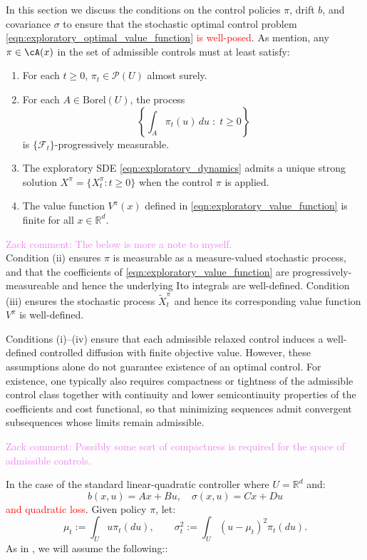 \documentclass[11pt,oneside,reqno]{article}
\theoremstyle{plain}
\theoremstyle{definition}
\numberwithin{equation}{section}
\renewcommand{\cite}{\citet}
\newcommand{\R}{\mathbb{R}}
\newcommand{\red}{\textcolor{red}}
\newcommand{\zack}[1]{\textcolor{Violet}{Zack comment: #1}}
\begin{document}
In this section we discuss the conditions on the control policies $\pi$, drift $b$, and covariance $\sigma$ to ensure that the 
stochastic optimal control problem \eqref{eqn:exploratory_optimal_value_function} \red{is well-posed}. As \cite{WangZariphopoulouZhou2020} mention, any $\pi \in \cA(x)$ in the set of admissible 
controls must at least satisfy:
%
\begin{enumerate}[label=(\roman*)]
    \item For each $t \ge 0$, $\pi_t \in \mathcal{P}(U)$ almost surely.

    \item For each $A \in \mathrm{Borel}(U)$, the process
    \[
    \left\{ \int_A \pi_t(u)\,du \;:\; t \ge 0 \right\}
    \]
    is $\{\mathcal{F}_t\}$-progressively measurable.

    \item The exploratory SDE \eqref{eqn:exploratory_dynamics} admits a unique strong solution
    $X^\pi = \{X^\pi_t : t \ge 0\}$ when the control $\pi$ is applied.

    \item The value function $V^\pi(x)$ defined in \eqref{eqn:exploratory_value_function} is finite for all $x \in \R^d$.
\end{enumerate}
%

\zack{The below is more a note to myself.}\\

\noindent Condition (ii) ensures $\pi$ is measurable as a measure-valued stochastic process, and that the coefficients of \eqref{eqn:exploratory_value_function}
are progressively-measureable and hence the underlying Ito integrals are well-defined. Condition (iii) ensures the stochastic process $\tilde{X}^\pi_t$ and hence
its corresponding value function $V^\pi$ is well-defined.
 
Conditions (i)–(iv) ensure that each admissible relaxed control induces a well-defined controlled diffusion 
with finite objective value. However, these assumptions alone do not
 guarantee existence of an optimal control. For existence, one typically also requires compactness or tightness 
 of the admissible control class together with continuity and lower semicontinuity properties of the coefficients
and cost functional, so that minimizing sequences admit convergent subsequences whose limits remain admissible.

\zack{Possibly some sort of compactness is required for the space of admissible controls.}

\noindent In the case of the standard linear-quadratic controller where $U = \R^d$ and:
%
\[b(x,u) = Ax + Bu, \quad \sigma(x,u) = Cx + Du\]
%
\noindent \red{and quadratic loss}. Given policy $\pi$, let:
%
\[\mu_t := \int_U u \pi_t(du), \qquad \sigma_t^2 := \int_U (u - \mu_t)^2 \pi_t(du). \]
%
\noindent As in \cite{WangZariphopoulouZhou2020}, we will assume the following::
\end{document}
